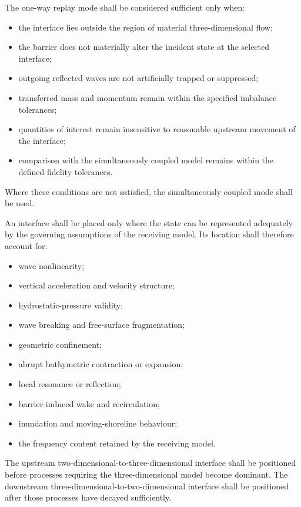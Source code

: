 The one-way replay mode shall be considered sufficient only when:
\begin{itemize}
  \item the interface lies outside the region of material three-dimensional flow;
  \item the barrier does not materially alter the incident state at the selected interface;
  \item outgoing reflected waves are not artificially trapped or suppressed;
  \item transferred mass and momentum remain within the specified imbalance tolerances;
  \item quantities of interest remain insensitive to reasonable upstream movement of the interface;
  \item comparison with the simultaneously coupled model remains within the defined fidelity tolerances.
\end{itemize}
Where these conditions are not satisfied, the simultaneously coupled mode shall be used.

An interface shall be placed only where the state can be represented
adequately by the governing assumptions of the receiving model. Its
location shall therefore account for:

\begin{itemize}
  \item wave nonlinearity;
  \item vertical acceleration and velocity structure;
  \item hydrostatic-pressure validity;
  \item wave breaking and free-surface fragmentation;
  \item geometric confinement;
  \item abrupt bathymetric contraction or expansion;
  \item local resonance or reflection;
  \item barrier-induced wake and recirculation;
  \item inundation and moving-shoreline behaviour;
  \item the frequency content retained by the receiving model.
\end{itemize}

The upstream two-dimensional-to-three-dimensional interface shall be
positioned before processes requiring the three-dimensional model become
dominant. The downstream three-dimensional-to-two-dimensional interface
shall be positioned after those processes have decayed sufficiently.

